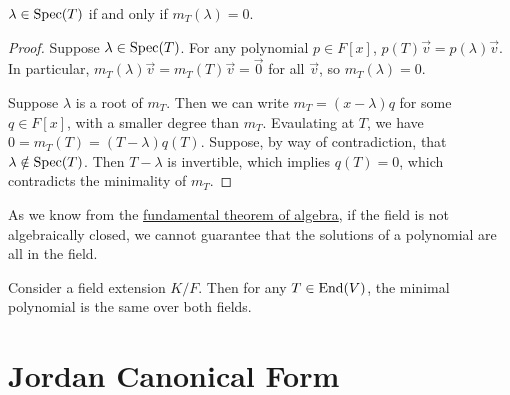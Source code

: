 \begin{lemma}
    \(\lambda \in \operatorname{Spec}(T)\) if and only if \(m_T(\lambda) = 0\).
\end{lemma}
\begin{proof}
    Suppose \(\lambda \in \operatorname{Spec}(T)\).
    For any polynomial \(p \in F[x]\),
    \(p(T)\vec{v} = p(\lambda)\vec{v}\).
    In particular, \(m_T(\lambda)\vec{v} = m_T(T)\vec{v} = \vec{0}\) for all \(\vec{v}\),
    so \(m_T(\lambda) = 0\).

    Suppose \(\lambda\) is a root of \(m_T\).
    Then we can write \(m_T = (x-\lambda)q\) for some \(q \in F[x]\),
    with a smaller degree than \(m_T\).
    Evaulating at \(T\), we have \(0 = m_T(T) = (T-\lambda)q(T)\).
    Suppose, by way of contradiction, that \(\lambda \notin \operatorname{Spec}(T)\).
    Then \(T-\lambda\) is invertible, which implies \(q(T) = 0\),
    which contradicts the minimality of \(m_T\).
\end{proof}
\begin{remark}
    As we know from the \hyperref[thm:fta]{fundamental theorem of algebra},
    if the field is not algebraically closed,
    we cannot guarantee that the solutions of a polynomial are all in the field.
\end{remark}
\begin{corollary}
    Consider a field extension \(K/F\).
    Then for any \(T \in \operatorname{End}(V)\),
    the minimal polynomial is the same over both fields.
\end{corollary}
    


\section{Jordan Canonical Form}
